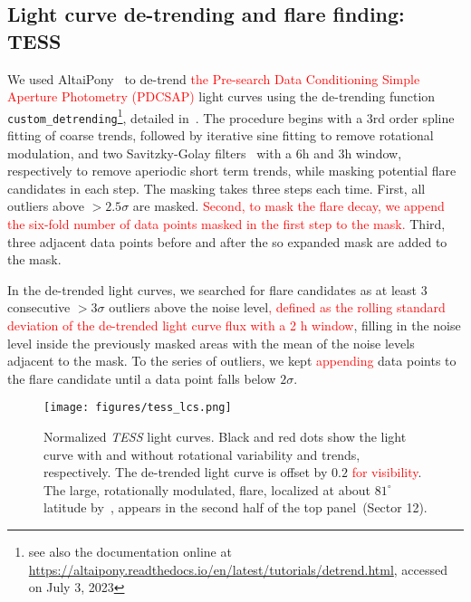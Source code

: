 \documentclass[twocolumn]{aastex631}
\begin{document}
\subsection{Light curve de-trending and flare finding: TESS}
\label{sec:methods:tess}
We used AltaiPony~\citep{ilin2021altaipony} to de-trend \textcolor{red}{the Pre-search Data Conditioning Simple Aperture Photometry (PDCSAP)} light curves using the de-trending function \texttt{custom\_detrending}\footnote{see also the documentation online at \url{https://altaipony.readthedocs.io/en/latest/tutorials/detrend.html}, accessed on July 3, 2023}, detailed in~\citet{ilin2022searching}. The procedure begins with a 3rd order spline fitting of coarse trends, followed by iterative sine fitting to remove rotational modulation, and two Savitzky-Golay filters~\citep{savitzky1964smoothing} with a 6h and 3h window, respectively to remove aperiodic short term trends, while masking potential flare candidates in each step. The masking takes three steps each time. First, all outliers above $>2.5\sigma$ are masked. \textcolor{red}{Second, to mask the flare decay, we append the six-fold number of data points masked in the first step to the mask.} Third, three adjacent data points before and after the so expanded mask are added to the mask. 

In the de-trended light curves, we searched for flare candidates as at least 3 consecutive $>3\sigma$ outliers above the noise level\textcolor{red}{, defined as the rolling standard deviation of the de-trended light curve flux with a 2 h window}, filling in the noise level inside the previously masked areas with the mean of the noise levels adjacent to the mask. To the series of outliers, we kept \textcolor{red}{appending} data points to the flare candidate until a data point falls below $2\sigma$. 

\begin{figure*}
    \begin{centering}
        \texttt{[image: figures/tess\_lcs.png]}
        \caption{
         Normalized \textit{TESS} light curves. Black and red dots show the light curve with and without rotational variability and trends, respectively. The de-trended light curve is offset by $0.2$ \textcolor{red}{for visibility}. The large, rotationally modulated, flare, localized at about $81^{\circ}$ latitude by~\citet{ilin2021giant}, appears in the second half of the top panel~(Sector 12).}
        \label{fig:tess_lcs}
    \end{centering}
\end{figure*}
\end{document}
